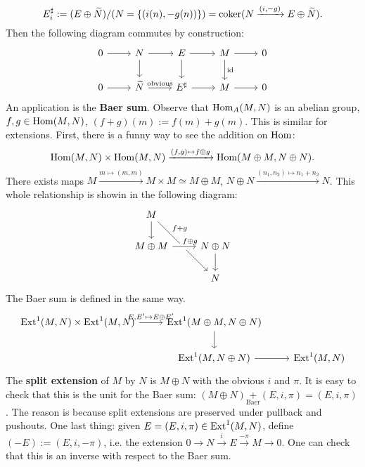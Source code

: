 \[
    E_i  ^{\sharp}:= (E\oplus \widetilde N) / (N = \{(i(n), -g(n))\})=\operatorname{coker} (N \xrightarrow{(i,-g)} E\oplus \widetilde N).
\] Then the following diagram commutes by construction: \[
\begin{tikzcd}
0 \arrow[r] & N \arrow[d] \arrow[r]  & E \arrow[r] \arrow[d] & M \arrow[r] \arrow[d, "\id"] & 0 \\
0 \arrow[r] & \widetilde N \arrow[r,"\text{obvious}" ] & E^{\sharp} \arrow[r]  & M \arrow[r]                             & 0
\end{tikzcd}
\] An application is the \textbf{Baer sum}. Observe that $\operatorname{Hom}_A(M,N)$ is an abelian group, $f , g \in \operatorname{Hom}(M,N)$, $(f+g)(m) := f(m)+g(m)$. This is similar for extensions. First, there is a funny way to see the addition on $\operatorname{Hom}$: \[
\operatorname{Hom}(M,N) \times \operatorname{Hom}(M,N) \xrightarrow{(f,g) \mapsto  f\oplus g} \operatorname{Hom}(M\oplus M, N\oplus N).
\] There exists maps $M \xrightarrow{ m \mapsto (m,m)} M \times  M \simeq  M \oplus M$, $N \oplus N \xrightarrow{(n_1,n_2) \mapsto  n_1+n_2} N$. This whole relationship is showin in the following diagram: \[
\begin{tikzcd}
M \arrow[d] \arrow[rdd, "f+g", near start]   &                     \\
M\oplus M \arrow[r, "f\oplus g", crossing over,near end] & N\oplus N \arrow[d] \\
                                 & N                  
\end{tikzcd}
\] The Baer sum is defined in the same way. \[
\begin{tikzcd}
{\Ext^1(M,N)\times \Ext^1(M,N)} \arrow[r, "{E,E' \mapsto E\oplus E'}"] & {\Ext^1(M\oplus M,N\oplus N)} \arrow[d] &               \\
                                                                       & {\Ext^1(M,N\oplus N)} \arrow[r]         & {\Ext^1(M,N)}
\end{tikzcd}
\] The \textbf{split extension} of $M$ by $N$ is $M\oplus N$ with the obvious $i$ and $\pi$. It is easy to check that this is the unit for the Baer sum: $(M\oplus N) \underset{\text{Baer} }{+} (E,i,\pi)=(E,i,\pi)$. The reason is because split extensions are preserved under pullback and pushouts. One last thing: given $E= (E,i,\pi) \in \operatorname{Ext}^1(M,N)$, define $(-E) := (E,i, -\pi)$, i.e. the extension $0 \to  N \xrightarrow iE \xrightarrow{-\pi} M \to  0$. One can check that this is an inverse with respect to the Baer sum.
